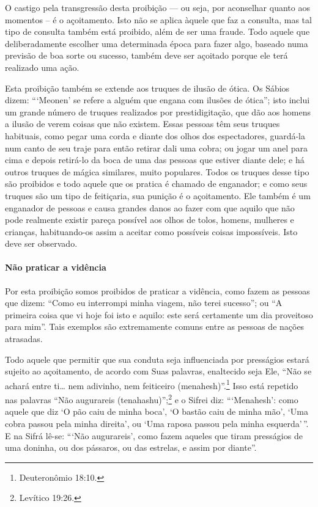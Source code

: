 O castigo pela transgressão desta proibição --- ou seja, por aconselhar
quanto aos momentos -- é o açoitamento. Isto não se aplica àquele que
faz a consulta, mas tal tipo de consulta também está proibido, além de
ser uma fraude. Todo aquele que deliberadamente escolher uma determinada
época para fazer algo, baseado numa previsão de boa sorte ou sucesso,
também deve ser açoitado porque ele terá realizado uma ação.

Esta proibição também se extende aos truques de ilusão de ótica. Os
Sábios dizem: ```Meonen' se refere a alguém que engana com ilusões de
ótica''; isto inclui um grande número de truques realizados por
prestidigitação, que dão aos homens a ilusão de verem coisas que não
existem. Essas pessoas têm seus truques habituais, como pegar uma corda
e diante dos olhos dos espectadores, guardá-la num canto de seu traje
para então retirar dali uma cobra; ou jogar um anel para cima e depois
retirá-lo da boca de uma das pessoas que estiver diante dele; e há
outros truques de mágica similares, muito populares. Todos os truques
desse tipo são proibidos e todo aquele que os pratica é chamado de
enganador; e como seus truques são um tipo de feitiçaria, sua punição é
o açoitamento. Ele também é um enganador de pessoas e causa grandes
danos ao fazer com que aquilo que não pode realmente existir pareça
possível aos olhos de tolos, homens, mulheres e crianças, habituando-os assim a
aceitar como possíveis coisas impossíveis. Isto deve ser observado.

\paragraph{Não praticar a vidência}

Por esta proibição somos proibidos de praticar a vidência, como fazem
as pessoas que dizem: ``Como eu interrompi minha viagem, não terei
sucesso''; ou ``A primeira coisa que vi hoje foi isto e aquilo: este
será certamente um dia proveitoso para mim''. Tais exemplos são
extremamente comuns entre as pessoas de nações atrasadas.

Todo aquele que permitir que sua conduta seja influenciada por
presságios estará sujeito ao açoitamento, de acordo com Suas palavras,
enaltecido seja Ele, ``Não se achará entre ti\ldots{} nem adivinho, nem
feiticeiro (menahesh)''.\footnote{Deuteronômio 18:10.} Isso está repetido nas
palavras ``Não augurareis (tenahashu)'';\footnote{Levítico 19:26.} e o Sifrei
diz: ```Menahesh': como aquele que diz `O pão caiu de minha boca', `O
bastão caiu de minha mão', `Uma cobra passou pela minha direita', ou
`Uma raposa passou pela minha esquerda'\,''. E na Sifrá lê-se: ```Não
augurareis', como fazem aqueles que tiram presságios de uma doninha, ou
dos pássaros, ou das estrelas, e assim por diante''.

